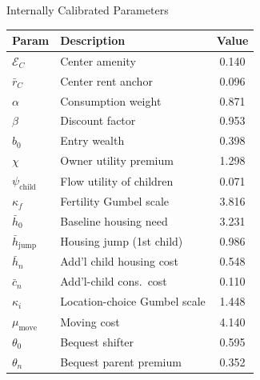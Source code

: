 \documentclass[11pt,aspectratio=169]{beamer}
\begin{document}
\begin{frame}{Internally Calibrated Parameters \; \hyperlink{app:calibration_strategy}{}}
\footnotesize
\renewcommand{\arraystretch}{0.85}
\centering
\begin{tabular}{llc}
\toprule
\textbf{Param} & \textbf{Description} & \textbf{Value} \\
\midrule
$\mathcal{E}_C$ & Center amenity & 0.140 \\
$\bar r_C$ & Center rent anchor & 0.096 \\
$\alpha$ & Consumption weight & 0.871 \\
$\beta$ & Discount factor & 0.953 \\
$b_0$ & Entry wealth & 0.398 \\
$\chi$ & Owner utility premium & 1.298 \\
$\psi_{\text{child}}$ & Flow utility of children & 0.071 \\
$\kappa_f$ & Fertility Gumbel scale & 3.816 \\
$\bar h_0$ & Baseline housing need & 3.231 \\
$\bar h_{\text{jump}}$ & Housing jump (1st child) & 0.986 \\
$\bar h_n$ & Add'l child housing cost & 0.548 \\
$\bar c_n$ & Add'l-child cons.\ cost & 0.110 \\
$\kappa_i$ & Location-choice Gumbel scale & 1.448 \\
$\mu_{\text{move}}$ & Moving cost & 4.140 \\
$\theta_0$ & Bequest shifter & 0.595 \\
$\theta_n$ & Bequest parent premium & 0.352 \\
\bottomrule
\end{tabular}
\end{frame}
\end{document}
